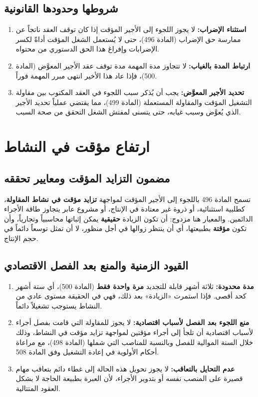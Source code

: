 \subsection{شروطها وحدودها القانونية}
\begin{enumerate}[leftmargin=*, itemsep=6pt]
    \item \textbf{استثناء الإضراب:} لا يجوز اللجوء إلى الأجير المؤقت إذا كان توقف العقد ناتجاً عن ممارسة حق الإضراب (المادة \textenglish{496})، حتى لا يُستعمل الشغل المؤقت أداةً لكسر الإضرابات وإفراغ هذا الحق الدستوري من محتواه.
    \item \textbf{ارتباط المدة بالغياب:} لا تتجاوز مدة المهمة مدة توقف عقد الأجير المعوَّض (المادة \textenglish{500})، فإذا عاد هذا الأخير انتهى مبرر المهمة فوراً.
    \item \textbf{تحديد الأجير المعوَّض:} يجب أن يُذكر سبب اللجوء في العقد المكتوب بين مقاولة التشغيل المؤقت والمقاولة المستعملة (المادة \textenglish{499})، مما يقتضي عملياً تحديد الأجير الذي يُعوَّض وسبب غيابه، حتى يتسنى لمفتش الشغل التحقق من صحة السبب.
\end{enumerate}

\section{ارتفاع مؤقت في النشاط}

\subsection{مضمون التزايد المؤقت ومعايير تحققه}
تسمح المادة \textenglish{496} باللجوء إلى الأجير المؤقت لمواجهة \textbf{تزايد مؤقت في نشاط المقاولة}، كطلبية استثنائية، أو ذروة غير معتادة في الإنتاج، أو مشروع عابر يتجاوز طاقة الأجراء الدائمين. والمعيار هنا مزدوج: أن تكون الزيادة \textbf{حقيقية} يمكن إثباتها محاسبياً وتجارياً، وأن تكون \textbf{مؤقتة} بطبيعتها، أي أن ينتظر زوالها في أجل منظور، لا أن تمثل توسعاً دائماً في حجم الإنتاج.

\subsection{القيود الزمنية والمنع بعد الفصل الاقتصادي}
\begin{enumerate}[leftmargin=*, itemsep=6pt]
    \item \textbf{مدة محدودة:} ثلاثة أشهر قابلة للتجديد \textbf{مرة واحدة فقط} (المادة \textenglish{500})، أي ستة أشهر كحد أقصى. فإذا استمرت «الزيادة» بعد ذلك، فهي في الحقيقة مستوى عادي من النشاط يستوجب تشغيلاً دائماً.
    \item \textbf{منع اللجوء بعد الفصل لأسباب اقتصادية:} لا يجوز للمقاولة التي قامت بفصل أجراء لأسباب اقتصادية أن تلجأ إلى أجراء مؤقتين لمواجهة تزايد مؤقت في النشاط، وذلك خلال السنة الموالية للفصل وبالنسبة للمناصب التي شملها (المادة \textenglish{498})، مع مراعاة أحكام الأولوية في إعادة التشغيل وفق المادة \textenglish{508}.
    \item \textbf{عدم التحايل بالتعاقب:} لا يجوز تحويل هذه الحالة إلى غطاء دائم بتعاقب مهام قصيرة على المنصب نفسه أو بتدوير الأجراء، لأن العبرة بطبيعة الحاجة لا بشكل العقود المتتالية.
\end{enumerate}

